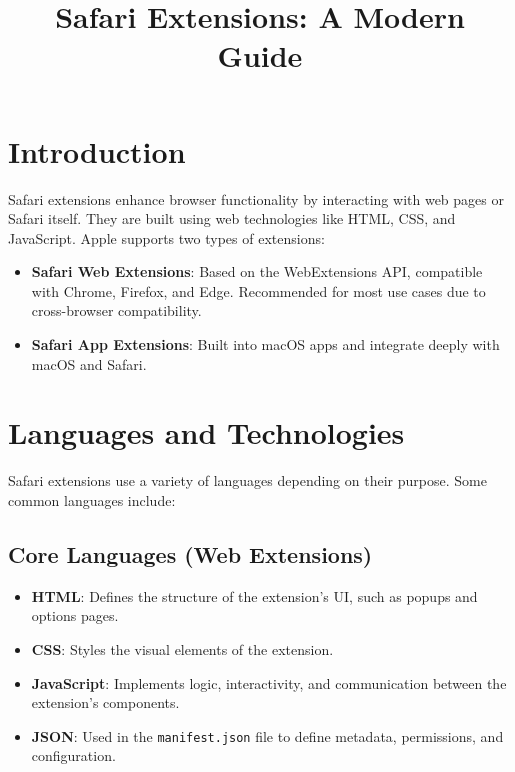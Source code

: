 \documentclass[a4paper,12pt]{article}
\title{\Huge \textbf{Safari Extensions: A Modern Guide}}
\author{}
\date{}
\begin{document}
\maketitle

\section{Introduction}
Safari extensions enhance browser functionality by interacting with web pages or Safari itself. They are built using web technologies like HTML, CSS, and JavaScript. Apple supports two types of extensions:

\begin{InfoBox}
    \begin{itemize}
        \item \textbf{Safari Web Extensions}: Based on the WebExtensions API, compatible with Chrome, Firefox, and Edge. Recommended for most use cases due to cross-browser compatibility.
        \item \textbf{Safari App Extensions}: Built into macOS apps and integrate deeply with macOS and Safari.
    \end{itemize}
\end{InfoBox}

\section{Languages and Technologies}
Safari extensions use a variety of languages depending on their purpose. Some common languages include:

\subsection{Core Languages (Web Extensions)}
\begin{itemize}
    \item \textbf{HTML}: Defines the structure of the extension's UI, such as popups and options pages.
    \item \textbf{CSS}: Styles the visual elements of the extension.
    \item \textbf{JavaScript}: Implements logic, interactivity, and communication between the extension's components.
    \item \textbf{JSON}: Used in the \texttt{manifest.json} file to define metadata, permissions, and configuration.
\end{itemize}
\end{document}
